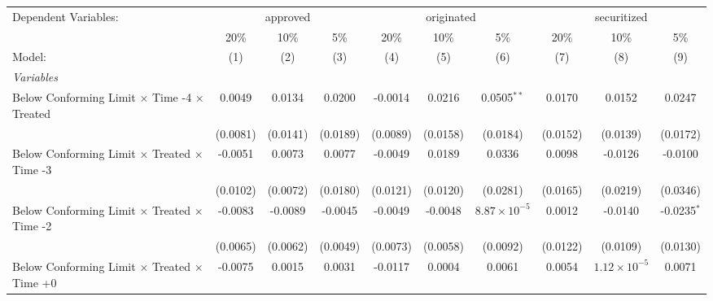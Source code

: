 \begingroup
\centering
\begin{tabular}{lccccccccc}
   \tabularnewline \midrule \midrule
   Dependent Variables: & \multicolumn{3}{c}{approved} & \multicolumn{3}{c}{originated} & \multicolumn{3}{c}{securitized}\\
                                                              & 20\%           & 10\%           & 5\%            & 20\%          & 10\%           & 5\%                   & 20\%          & 10\%                  & 5\% \\    
   Model:                                                     & (1)            & (2)            & (3)            & (4)           & (5)            & (6)                   & (7)           & (8)                   & (9)\\  
   \midrule
   \emph{Variables}\\
   Below Conforming Limit $\times$ Time -4 $\times$ Treated   & 0.0049         & 0.0134         & 0.0200         & -0.0014       & 0.0216         & 0.0505$^{**}$         & 0.0170        & 0.0152                & 0.0247\\   
                                                              & (0.0081)       & (0.0141)       & (0.0189)       & (0.0089)      & (0.0158)       & (0.0184)              & (0.0152)      & (0.0139)              & (0.0172)\\   
   Below Conforming Limit $\times$ Treated $\times$ Time -3   & -0.0051        & 0.0073         & 0.0077         & -0.0049       & 0.0189         & 0.0336                & 0.0098        & -0.0126               & -0.0100\\   
                                                              & (0.0102)       & (0.0072)       & (0.0180)       & (0.0121)      & (0.0120)       & (0.0281)              & (0.0165)      & (0.0219)              & (0.0346)\\   
   Below Conforming Limit $\times$ Treated $\times$ Time -2   & -0.0083        & -0.0089        & -0.0045        & -0.0049       & -0.0048        & $8.87\times 10^{-5}$  & 0.0012        & -0.0140               & -0.0235$^{*}$\\   
                                                              & (0.0065)       & (0.0062)       & (0.0049)       & (0.0073)      & (0.0058)       & (0.0092)              & (0.0122)      & (0.0109)              & (0.0130)\\   
   Below Conforming Limit $\times$ Treated $\times$ Time +0   & -0.0075        & 0.0015         & 0.0031         & -0.0117       & 0.0004         & 0.0061                & 0.0054        & $1.12\times 10^{-5}$  & 0.0071\\   

\end{tabular}
